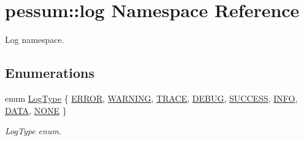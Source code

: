 \hypertarget{namespacepessum_1_1log}{}\section{pessum\+:\+:log Namespace Reference}
\label{namespacepessum_1_1log}


Log namespace.  


\subsection*{Enumerations}
\begin{DoxyCompactItemize}
\item 
enum \hyperlink{namespacepessum_1_1log_a67fb11f9f43693f8926c9cfaa70ecd55}{Log\+Type} \{ \newline
\hyperlink{namespacepessum_1_1log_a67fb11f9f43693f8926c9cfaa70ecd55a121640328e25851e91872a01b0af8003}{E\+R\+R\+OR}, 
\hyperlink{namespacepessum_1_1log_a67fb11f9f43693f8926c9cfaa70ecd55abc2321518f4ee11863abaede8730a8b7}{W\+A\+R\+N\+I\+NG}, 
\hyperlink{namespacepessum_1_1log_a67fb11f9f43693f8926c9cfaa70ecd55a1d750823b7e576d0ce9f39d60ccfb801}{T\+R\+A\+CE}, 
\hyperlink{namespacepessum_1_1log_a67fb11f9f43693f8926c9cfaa70ecd55af1b9b21e96f5a2e0c597a5093c29be3e}{D\+E\+B\+UG}, 
\newline
\hyperlink{namespacepessum_1_1log_a67fb11f9f43693f8926c9cfaa70ecd55ac28cdd84c2610190fdae4009ca127e29}{S\+U\+C\+C\+E\+SS}, 
\hyperlink{namespacepessum_1_1log_a67fb11f9f43693f8926c9cfaa70ecd55a8f75509d18a81170601c175d47b8ec2b}{I\+N\+FO}, 
\hyperlink{namespacepessum_1_1log_a67fb11f9f43693f8926c9cfaa70ecd55a23e1c15f507dbc78bc3d75cd6eb66f00}{D\+A\+TA}, 
\hyperlink{namespacepessum_1_1log_a67fb11f9f43693f8926c9cfaa70ecd55a2648766f4242da69451d37d40f680065}{N\+O\+NE}
 \}\begin{DoxyCompactList}\small\item\em Log\+Type enum. \end{DoxyCompactList}
\end{DoxyCompactItemize}
